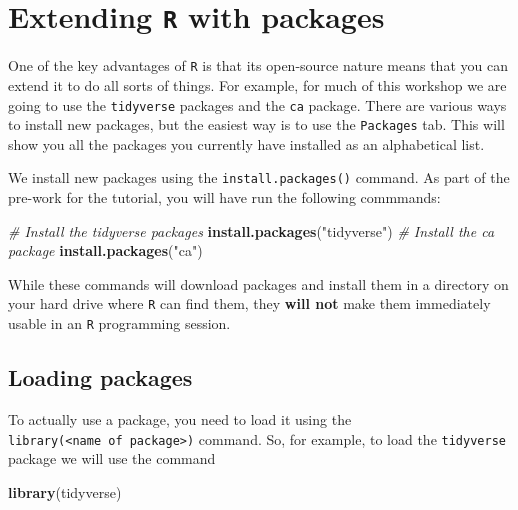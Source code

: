 \documentclass[
]{book}
\newenvironment{Shaded}{\begin{snugshade}}{\end{snugshade}}
\newcommand{\CommentTok}[1]{\textcolor[rgb]{0.56,0.35,0.01}{\textit{#1}}}
\newcommand{\FunctionTok}[1]{\textcolor[rgb]{0.13,0.29,0.53}{\textbf{#1}}}
\newcommand{\NormalTok}[1]{#1}
\newcommand{\StringTok}[1]{\textcolor[rgb]{0.31,0.60,0.02}{#1}}
\begin{document}
\hypertarget{extending-r-with-packages}{%
\section{\texorpdfstring{Extending \texttt{R} with packages}{Extending R with packages}}\label{extending-r-with-packages}}

One of the key advantages of \texttt{R} is that its open-source nature means that you can extend it to do all sorts of things. For example, for much of this workshop we are going to use the \texttt{tidyverse} packages and the \texttt{ca} package. There are various ways to install new packages, but the easiest way is to use the \texttt{Packages} tab. This will show you all the packages you currently have installed as an alphabetical list.

We install new packages using the \texttt{install.packages()} command. As part of the pre-work for the tutorial, you will have run the following commmands:

\begin{Shaded}
\begin{Highlighting}[]
\CommentTok{\# Install the tidyverse packages}
\FunctionTok{install.packages}\NormalTok{(}\StringTok{"tidyverse"}\NormalTok{)}
\CommentTok{\# Install the ca package}
\FunctionTok{install.packages}\NormalTok{(}\StringTok{"ca"}\NormalTok{)}
\end{Highlighting}
\end{Shaded}

While these commands will download packages and install them in a directory on your hard drive where \texttt{R} can find them, they \textbf{will not} make them immediately usable in an \texttt{R} programming session.

\hypertarget{loading-packages}{%
\subsection{Loading packages}\label{loading-packages}}

To actually use a package, you need to load it using the \texttt{library(\textless{}name\ of\ package\textgreater{})} command. So, for example, to load the \texttt{tidyverse} package we will use the command

\begin{Shaded}
\begin{Highlighting}[]
\FunctionTok{library}\NormalTok{(tidyverse)}
\end{Highlighting}
\end{Shaded}
\end{document}
